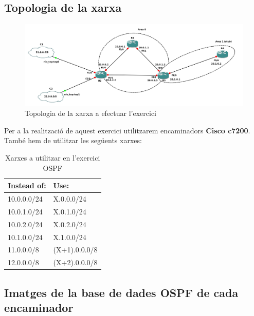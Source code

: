 \documentclass[10pt]{article}
\begin{document}
\subsection{Topologia de la xarxa}
\begin{figure}[H]
\begin{center}
\includegraphics[scale=0.5]{Images/ospf.png}
\caption{Topologia de la xarxa a efectuar l'exercici}
\end{center}
\end{figure}
Per a la realització de aquest exercici utilitzarem encaminadors \textbf{Cisco c7200}. També hem de utilitzar les següents xarxes:
\begin{table}[h!]
\centering
\label{my-label}
\begin{tabular}{|l|l|}
\hline
Instead of: & Use:          \\ \hline
10.0.0.0/24 & X.0.0.0/24    \\ \hline
10.0.1.0/24 & X.0.1.0/24    \\ \hline
10.0.2.0/24 & X.0.2.0/24    \\ \hline
10.1.0.0/24 & X.1.0.0/24    \\ \hline
11.0.0.0/8  & (X+1).0.0.0/8 \\ \hline
12.0.0.0/8  & (X+2).0.0.0/8 \\ \hline
\end{tabular}
\caption{Xarxes a utilitzar en l'exercici OSPF}
\end{table}
\subsection{Imatges de la base de dades OSPF de cada encaminador}
\end{document}
